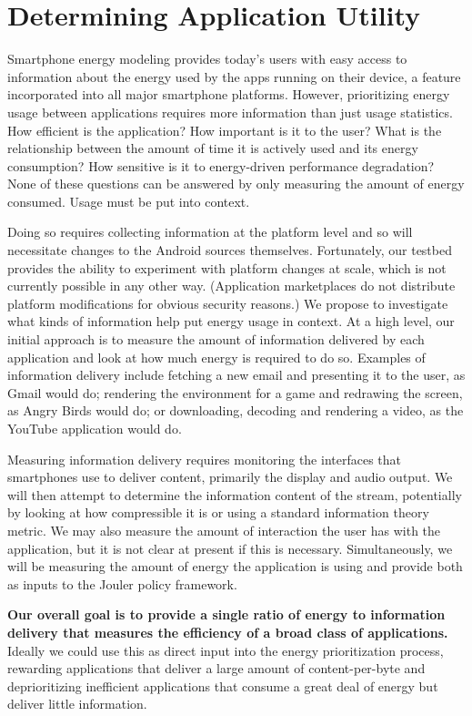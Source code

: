 \section{Determining Application Utility}
\label{sec-utility}

Smartphone energy modeling provides today's users with easy access to
information about the energy used by the apps running on their device, a
feature incorporated into all major smartphone platforms. However,
prioritizing energy usage between applications requires more information than
just usage statistics. How efficient is the application? How important is it
to the user? What is the relationship between the amount of time it is
actively used and its energy consumption? How sensitive is it to
energy-driven performance degradation? None of these questions can be
answered by only measuring the amount of energy consumed. Usage must be put
into context.

Doing so requires collecting information at the platform level and so will
necessitate changes to the Android sources themselves. Fortunately, our
\PhoneLab{} testbed provides the ability to experiment with platform changes
at scale, which is not currently possible in any other way. (Application
marketplaces do not distribute platform modifications for obvious security
reasons.) We propose to investigate what kinds of information help put energy
usage in context. At a high level, our initial approach is to measure the
amount of information delivered by each application and look at how much
energy is required to do so. Examples of information delivery include
fetching a new email and presenting it to the user, as Gmail would do;
rendering the environment for a game and redrawing the screen, as Angry Birds
would do; or downloading, decoding and rendering a video, as the YouTube
application would do.

Measuring information delivery requires monitoring the interfaces that
smartphones use to deliver content, primarily the display and audio output.
We will then attempt to determine the information content of the stream,
potentially by looking at how compressible it is or using a standard
information theory metric. We may also measure the amount of interaction the
user has with the application, but it is not clear at present if this is
necessary. Simultaneously, we will be measuring the amount of energy the
application is using and provide both as inputs to the Jouler policy
framework. 

\textbf{Our overall goal is to provide a single ratio of energy to
information delivery that measures the efficiency of a broad class of
applications.} Ideally we could use this as direct input into the energy
prioritization process, rewarding applications that deliver a large amount of
content-per-byte and deprioritizing inefficient applications that consume a
great deal of energy but deliver little information.
